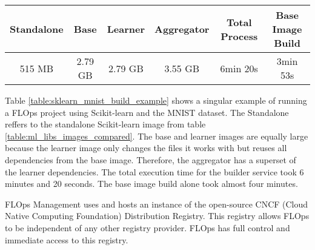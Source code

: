 \begin{changemargin}{0cm}{0cm}
    \centering
    \begin{tabular}{|c|c|c|c|c|c|}
        \hline
            \textbf{Standalone} & \textbf{Base} & \textbf{Learner} & \textbf{Aggregator} & \textbf{Total Process} & \textbf{Base Image Build} \\
        \hline
            515 MB & 2.79 GB & 2.79 GB & 3.55 GB & 6min 20s & 3min 53s
        \\
        \hline
    \end{tabular}
    \label{table:sklearn_mnist_build_example}
\end{changemargin}
Table \ref{table:sklearn_mnist_build_example} shows a singular example of running a FLOps project using Scikit-learn and the MNIST dataset.
The Standalone reffers to the standalone Scikit-learn image from table \ref{table:ml_libs_images_compared}.
The base and learner images are equally large because the learner image only changes the files it works with but reuses all dependencies from the base image.
Therefore, the aggregator has a superset of the learner dependencies.
The total execution time for the builder service took 6 minutes and 20 seconds.
The base image build alone took almost four minutes.

FLOps Management uses and hosts an instance of the open-source CNCF (Cloud Native Computing Foundation) Distribution Registry.
This registry allows FLOps to be independent of any other registry provider.
FLOps has full control and immediate access to this registry.

